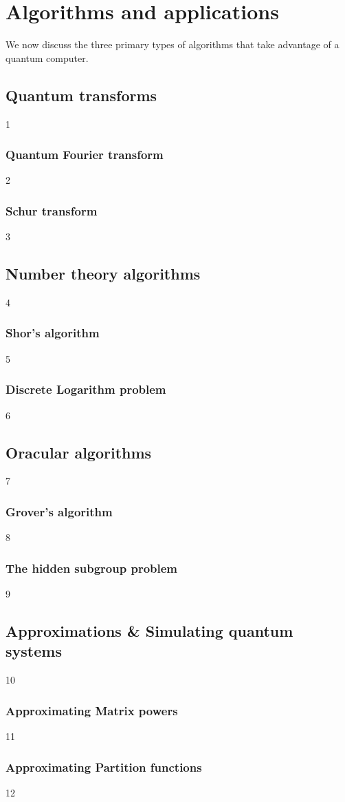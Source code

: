 \section{Algorithms and applications}

We now discuss the three primary types of algorithms that take advantage of a quantum computer.

\subsection{Quantum transforms}
1
\subsubsection{Quantum Fourier transform}
2
\subsubsection{Schur transform}
3
\subsection{Number theory algorithms}
4
\subsubsection{Shor's algorithm}
5
\subsubsection{Discrete Logarithm problem}
6
\subsection{Oracular algorithms}
7
\subsubsection{Grover's algorithm}
8
\subsubsection{The hidden subgroup problem}
9
\subsection{Approximations \& Simulating quantum systems}
10
\subsubsection{Approximating Matrix powers}
11
\subsubsection{Approximating Partition functions}
12